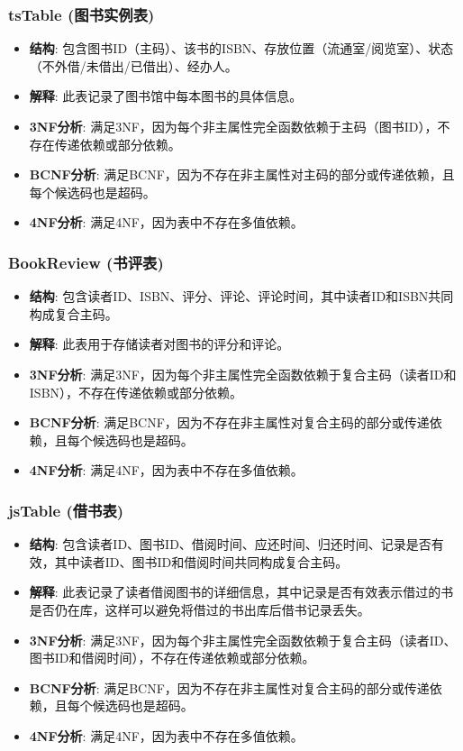 \documentclass{ctexart}
\begin{document}
\subsubsection{tsTable (图书实例表)}
\begin{itemize}
    \item \textbf{结构}: 包含图书ID（主码）、该书的ISBN、存放位置（流通室/阅览室）、状态（不外借/未借出/已借出）、经办人。
    \item \textbf{解释}: 此表记录了图书馆中每本图书的具体信息。
    \item \textbf{3NF分析}: 满足3NF，因为每个非主属性完全函数依赖于主码（图书ID），不存在传递依赖或部分依赖。
    \item \textbf{BCNF分析}: 满足BCNF，因为不存在非主属性对主码的部分或传递依赖，且每个候选码也是超码。
    \item \textbf{4NF分析}: 满足4NF，因为表中不存在多值依赖。
\end{itemize}

\subsubsection{BookReview (书评表)}
\begin{itemize}
    \item \textbf{结构}: 包含读者ID、ISBN、评分、评论、评论时间，其中读者ID和ISBN共同构成复合主码。
    \item \textbf{解释}: 此表用于存储读者对图书的评分和评论。
    \item \textbf{3NF分析}: 满足3NF，因为每个非主属性完全函数依赖于复合主码（读者ID和ISBN），不存在传递依赖或部分依赖。
    \item \textbf{BCNF分析}: 满足BCNF，因为不存在非主属性对复合主码的部分或传递依赖，且每个候选码也是超码。
    \item \textbf{4NF分析}: 满足4NF，因为表中不存在多值依赖。
\end{itemize}

\subsubsection{jsTable (借书表)}
\begin{itemize}
    \item \textbf{结构}: 包含读者ID、图书ID、借阅时间、应还时间、归还时间、记录是否有效，其中读者ID、图书ID和借阅时间共同构成复合主码。
    \item \textbf{解释}: 此表记录了读者借阅图书的详细信息，其中记录是否有效表示借过的书是否仍在库，这样可以避免将借过的书出库后借书记录丢失。
    \item \textbf{3NF分析}: 满足3NF，因为每个非主属性完全函数依赖于复合主码（读者ID、图书ID和借阅时间），不存在传递依赖或部分依赖。
    \item \textbf{BCNF分析}: 满足BCNF，因为不存在非主属性对复合主码的部分或传递依赖，且每个候选码也是超码。
    \item \textbf{4NF分析}: 满足4NF，因为表中不存在多值依赖。
\end{itemize}
\end{document}
